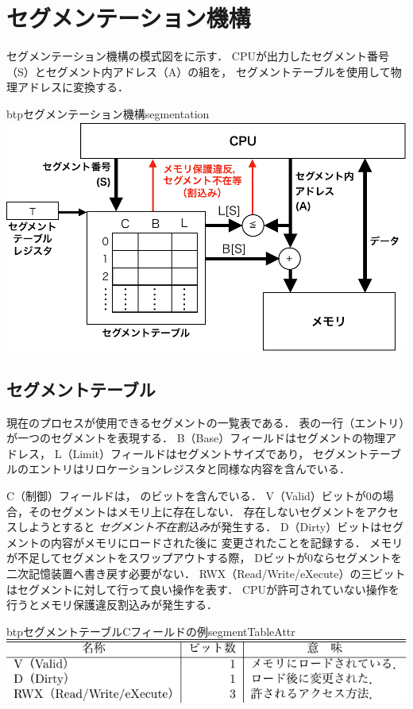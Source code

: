 \section{セグメンテーション機構}
セグメンテーション機構の模式図をに示す．
CPUが出力したセグメント番号（S）とセグメント内アドレス（A）の組を，
セグメントテーブルを使用して物理アドレスに変換する．

\begin{myfig}{btp}{セグメンテーション機構}{segmentation}
  \includegraphics[scale=0.6]{Fig/segmentation-crop.pdf}
\end{myfig}

\subsection{セグメントテーブル}
現在のプロセスが使用できるセグメントの一覧表である．
表の一行（エントリ）が一つのセグメントを表現する．
B（Base）フィールドはセグメントの物理アドレス，
L（Limit）フィールドはセグメントサイズであり，
セグメントテーブルのエントリはリロケーションレジスタと同様な内容を含んでいる．

C（制御）フィールドは，
のビットを含んでいる．
V（Valid）ビットが0の場合，そのセグメントはメモリ上に存在しない．
存在しないセグメントをアクセスしようとすると
\emph{セグメント不在割込み}が発生する．
D（Dirty）ビットはセグメントの内容がメモリにロードされた後に
変更されたことを記録する．
メモリが不足してセグメントをスワップアウトする際，
Dビットが0ならセグメントを二次記憶装置へ書き戻す必要がない．
RWX（Read/Write/eXecute）の三ビットはセグメントに対して行って良い操作を表す．
CPUが許可されていない操作を行うとメモリ保護違反割込みが発生する．

\begin{mytable}{btp}{セグメントテーブルCフィールドの例}{segmentTableAttr}
  \includegraphics[scale=1.0]{Tbl/segmentTableAttr.pdf}
\end{mytable}

